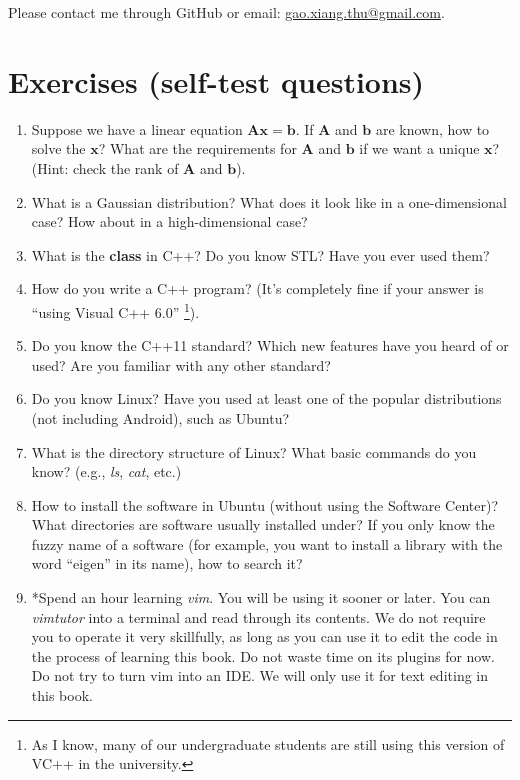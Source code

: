 Please contact me through GitHub or email: \href{mailto:gao.xiang.thu@gmail.com}{gao.xiang.thu@gmail.com}.

\section{Exercises (self-test questions)}
\begin{enumerate}
	\item Suppose we have a linear equation $\mathbf{Ax}=\mathbf{b}$. If $\mathbf{A}$ and $\mathbf{b}$ are known, how to solve the $\mathbf{x}$? What are the requirements for $\mathbf{A}$ and $\mathbf{b}$ if we want a unique $\mathbf{x}$? (Hint: check the rank of $\mathbf{A}$ and $\mathbf{b}$).
	
	\item What is a Gaussian distribution? What does it look like in a one-dimensional case? How about in a high-dimensional case?
	
	\item What is the \textbf{class} in C++? Do you know STL? Have you ever used them?
	
	\item How do you write a C++ program? (It's completely fine if your answer is ``using Visual C++ 6.0'' \footnote{As I know, many of our undergraduate students are still using this version of VC++ in the university. }).
	
	\item Do you know the C++11 standard? Which new features have you heard of or used? Are you familiar with any other standard?
	
	\item Do you know Linux? Have you used at least one of the popular distributions (not including Android), such as Ubuntu?
	
	\item What is the directory structure of Linux? What basic commands do you know? (e.g., \textit{ls}, \textit{cat}, etc.)
	
	\item How to install the software in Ubuntu (without using the Software Center)? What directories are software usually installed under? If you only know the fuzzy name of a software (for example, you want to install a library with the word ``eigen'' in its name), how to search it?
	
	\item *Spend an hour learning \textit{vim}. You will be using it sooner or later. You can \textit{vimtutor} into a terminal and read through its contents. We do not require you to operate it very skillfully, as long as you can use it to edit the code in the process of learning this book. Do not waste time on its plugins for now. Do not try to turn vim into an IDE. We will only use it for text editing in this book.
	
\end{enumerate}
